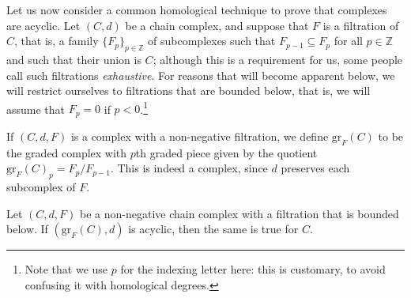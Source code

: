 %
%

Let us now consider a common homological technique to 
prove that complexes are acyclic. Let $(C,d)$ be
a chain complex, and suppose that $F$ is a filtration
of $C$, that is, a family 
$\{ F_p \}_{p\in\mathbb Z}$ of subcomplexes
such that $F_{p-1}\subseteq F_p$ for all
 $p\in \mathbb Z$ and such that their union is
 $C$; although this is a requirement for us, some
 people call such filtrations \emph{exhaustive}. For 
 reasons that will become apparent below,
 we will restrict ourselves to filtrations that are
 bounded below, that is, we will assume that $F_p=0$
 if $p<0$.\footnote{Note that we use $p$ for the
 indexing letter here: this is customary, to avoid
 confusing it with homological degrees.}
 
 If $(C,d,F)$ is a complex with a non-negative
 filtration, we define $\mathrm{gr}_F(C)$ to be
 the graded complex with $p$th graded piece given by
 the quotient $\mathrm{gr}_F(C)_p =   F_p/F_{p-1}$.
 This is indeed a complex, since $d$ preserves 
 each subcomplex of $F$.
 
 \begin{proposition}\label{prop:graded}
 Let $(C,d,F)$ be a non-negative chain
 complex with a filtration that is
 bounded below. If $(\mathrm{gr}_F(C),d)$ is
 acyclic, then the same is true for $C$.
\end{proposition}  
  
